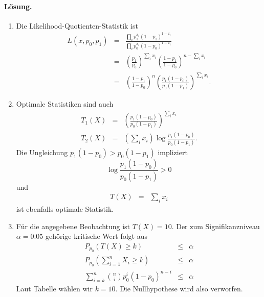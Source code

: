 \paragraph*{Lösung.}
\begin{enumerate}

    \item Die Likelihood-Quotienten-Statistik ist 
        \begin{eqnarray*}
            L(x,p_0,p_1) &=& \frac{ \prod_{i} p_1^{x_i}\left( 1-p_1 \right)^{1-x_i} }{ \prod_{i} p_0^{x_i}\left( 1-p_0 \right)^{1-x_i} } \\
            &=& \left( \frac{p_1}{p_0} \right)^{\sum_{i} x_i} \left( \frac{1-p_1}{1-p_0} \right)^{n - \sum_{i} x_i} \\ 
            &=& \left( \frac{1-p_1}{1-p_0} \right)^n 
            \left( \frac{ p_1 \left( 1-p_0 \right)}{ p_0 \left( 1-p_1 \right)} \right)^{\sum_{i}^{} x_i}.
        \end{eqnarray*}
    \item Optimale Statistiken sind auch
        \begin{eqnarray*}
            T_1(X) &=&  \left( \frac{ p_1 \left( 1-p_0 \right)}{ p_0 \left( 1-p_1 \right)} \right)^{\sum_{i}^{} x_i} \\
            T_2(X) &=& \left( \sum_{i}^{} x_i \right) \log \frac{ p_1 \left( 1-p_0 \right)}{ p_0 \left( 1-p_1 \right)}. 
        \end{eqnarray*}
        Die Ungleichung $p_1(1-p_0)> p_0(1-p_1)$ impliziert
        \begin{equation*}
            \log \frac{ p_1 \left( 1-p_0 \right)}{ p_0 \left( 1-p_1 \right)} >0 
        \end{equation*}
        und
        \begin{eqnarray*}
            T(X) &=& \sum_{i}^{} x_i
        \end{eqnarray*}
        ist ebenfalls optimale Statistik.
    \item Für die angegebene Beobachtung ist $T(X)=10$. Der zum Signifikanzniveau $\alpha=0.05$ 
        gehörige kritische Wert folgt aus
        \begin{eqnarray*}
            P_{p_0} \left( T(X) \geq k \right) &\leq& \alpha \\
            P_{p_0} \left( \sum_{i=1}^{n} X_i \geq k \right) &\leq& \alpha \\
            \sum_{i=k}^{n} \binom{n}{i} p_0^i \left( 1-p_0 \right)^{n-i} & \leq & \alpha
        \end{eqnarray*}
        Laut Tabelle wählen wir $k=10$. Die Nullhypothese wird also verworfen.
\end{enumerate}





